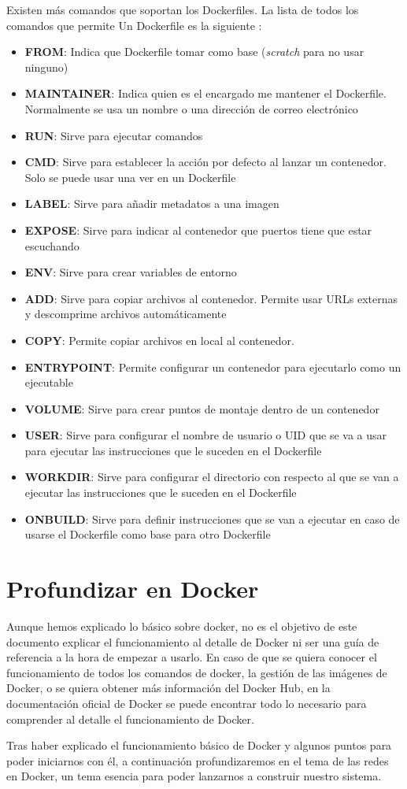 	Existen más comandos que soportan los Dockerfiles. La lista de todos los comandos que permite Un Dockerfile es la siguiente \cite{dockerfiles-doc}:
	\begin{itemize}
		 \item \textbf{FROM}: Indica que Dockerfile tomar como base (\textit{scratch} para no usar ninguno)
		 \item \textbf{MAINTAINER}: Indica quien es el encargado me mantener el Dockerfile. Normalmente se usa un nombre o una dirección de correo electrónico
		 \item \textbf{RUN}: Sirve para ejecutar comandos
		 \item \textbf{CMD}: Sirve para establecer la acción por defecto al lanzar un contenedor. Solo se puede usar una ver en un Dockerfile
		 \item \textbf{LABEL}: Sirve para añadir metadatos a una imagen
		 \item \textbf{EXPOSE}: Sirve para indicar al contenedor que puertos tiene que estar escuchando
		 \item \textbf{ENV}: Sirve para crear variables de entorno
		 \item \textbf{ADD}: Sirve para copiar archivos al contenedor. Permite usar URLs externas y descomprime archivos automáticamente
		 \item \textbf{COPY}: Permite copiar archivos en local al contenedor.
		 \item \textbf{ENTRYPOINT}: Permite configurar un contenedor para ejecutarlo como un ejecutable 
		 \item \textbf{VOLUME}: Sirve para crear puntos de montaje dentro de un contenedor
		 \item \textbf{USER}: Sirve para configurar el nombre de usuario o UID que se va a usar para ejecutar las instrucciones que le suceden en el Dockerfile
		 \item \textbf{WORKDIR}: Sirve para configurar el directorio con respecto al que se van a ejecutar las instrucciones que le suceden en el Dockerfile
		 \item \textbf{ONBUILD}: Sirve para definir instrucciones que se van a ejecutar en caso de usarse el Dockerfile como base para otro Dockerfile
	\end{itemize}
	
	\section{Profundizar en Docker}
	Aunque hemos explicado lo básico sobre docker, no es el objetivo de este documento explicar el funcionamiento al detalle de Docker ni ser una guía de referencia a la hora de empezar a usarlo. En caso de que se quiera conocer el funcionamiento de todos los comandos de docker, la gestión de las imágenes de Docker, o se quiera obtener más información del Docker Hub, en la documentación oficial de Docker \cite{docker-docs} se puede encontrar todo lo necesario para comprender al detalle el funcionamiento de Docker.
	
	Tras haber explicado el funcionamiento básico de Docker y algunos puntos para poder iniciarnos con él, a continuación profundizaremos en el tema de las redes en Docker, un tema esencia para poder lanzarnos a construir nuestro sistema.